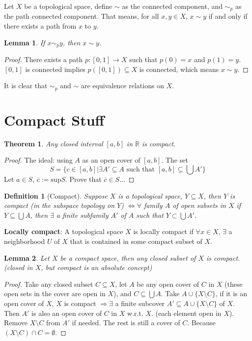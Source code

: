 \documentclass[article,11pt, reqno]{article}
\newtheorem*{theorem}{Theorem}
\newtheorem*{lemma}{Lemma}
\newtheorem*{definition}{Definition}
\theoremstyle{remark}
\newcommand{\<}{\langle}
\renewcommand{\>}{\rangle}
\begin{document}
Let $X$ be a topological space, define $\sim$ as the connected component, and $\sim_p$ as the path connected component. That means, for all $x,y\in X$, $x\sim y$ if and only if there exists a path from $x$ to $y$.

\begin{lemma}
    If $x\sim_p y$, then $x\sim y$.
\end{lemma}
\begin{proof}
    There exists a path $p:[0,1]\rightarrow X$ such that $p(0)=x$ and $p(1)=y$. $[0,1]$ is connected implies $p([0,1])\subseteq X$ is connected, which means $x\sim y$.
\end{proof}
It is clear that $\sim_p$ and $\sim$ are equivalence relations on $X$.\\
\section{Compact Stuff}
\begin{theorem}
    Any closed interval $[a,b]$ in $\mathbb{R}$ is compact.
\end{theorem}
\begin{proof}
    The ideal: using $A$ as an open cover of $[a,b]$. The set 
    $$
        S=\{c\in[a,b]| \exists A'\subseteq A \text{ such that } [a,b]\subseteq\bigcup A'\}
    $$
    Let $a\in S$, $\overline{c}:=\text{sup}S$. Prove that $\overline{c}\in S$...
\end{proof}
\begin{definition}[Compact]
    Suppose $X$ is a topological space, $Y\subseteq X$, then $Y$ is compact (in the subspace topology on $Y$) $\Leftrightarrow\forall$ family $A$ of open subsets in $X$ if $Y\subseteq \bigcup A$, then $\exists$ a finite subfamily $A'$ of $A$ such that $Y\subset\bigcup A'$.
\end{definition}
\noindent
\textbf{Locally compact}: A topological space $X$ is locally compact if $\forall x\in X$, $\exists $ a neighborhood $U$ of $X$ that is contained in some compact subset of $X$.
\begin{lemma}
    Let $X$ be a compact space, then any closed subset of $X$ is compact. (closed in $X$, but compact is an absolute concept)
\end{lemma}
\begin{proof}
    Take any closed subset $C\subseteq X$, let $A$ be any open cover of $C$ in $X$ (these open sets in the cover are open in $X$), and $C\subseteq\bigcup A$. Take $A\cup\{X\setminus C\}$, if it is an open cover of $X$, $X$ is compact $\Rightarrow\exists$ a finite subcover $A'\subseteq A\cup\{X\setminus C\}$ of $X$. Then $A'$ is also an open cover of $C$ in $X$ w.r.t. $X$. (each element open in $X$). Remove $X\setminus C$ from $A'$ if needed. The rest is still a cover of $C$. Because $(X\setminus C)\cap C=\emptyset$.
\end{proof}
\end{document}
